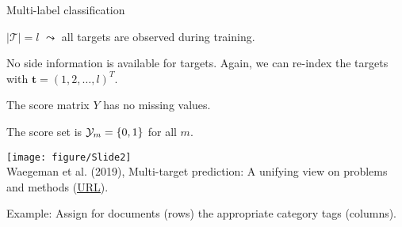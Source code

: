 \documentclass[11pt,compress,t,notes=noshow, xcolor=table]{beamer}
\newcommand{\Tspace}{\mathcal{T}}
\newcommand{\tv}{\mathbf{t}}
\begin{document}
\begin{frame}{Multi-label classification}
	\small
	\begin{itemize}
		\small 

        \begin{minipage}{0.45\textwidth}  
            \item $|\Tspace|=l$ $\leadsto$ all targets are observed during training.
            \vspace{10pt}
            
            \item No side information is available for targets. Again, we can re-index the targets with $\tv = (1, 2, \ldots, l)^T$. 
            \vspace{10pt}
            
			\item The score matrix $Y$ has no missing values. 	
            \vspace{10pt}
			\item The score set is $\mathcal{Y}_m = \{0,1\}$ for all $m$.	
		\end{minipage}
        \hfill
		\begin{minipage}{0.45\textwidth}    
		\begin{center}
			\texttt{[image: figure/Slide2]} \tiny
			\\ Waegeman et al. (2019), Multi-target prediction:
			A unifying view on problems and methods (\href{https://arxiv.org/pdf/1809.02352.pdf}{\underline{URL}}).
		\end{center}
		\end{minipage}
	\end{itemize}	

    \vspace{10pt}
	Example: Assign for documents (rows) the appropriate category tags (columns).

\end{frame}
\end{document}
